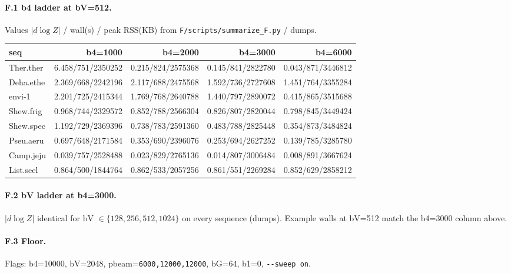 \documentclass[11pt]{article}
\begin{document}
\paragraph{F.1 b4 ladder at bV=512.}
Values $|d\log Z|$ / wall(s) / peak RSS(KB) from \texttt{F/scripts/summarize\_F.py} / dumps.

{\footnotesize
\begin{center}
\begin{tabular}{@{}lrrrr@{}}
\toprule
seq & b4=1000 & b4=2000 & b4=3000 & b4=6000 \\
\midrule
Ther.ther & 6.458/751/2350252 & 0.215/824/2575368 & 0.145/841/2822780 & 0.043/871/3446812 \\
Deha.ethe & 2.369/668/2242196 & 2.117/688/2475568 & 1.592/736/2727608 & 1.451/764/3355284 \\
envi-1 & 2.201/725/2415344 & 1.769/768/2640788 & 1.440/797/2890072 & 0.415/865/3515688 \\
Shew.frig & 0.968/744/2329572 & 0.852/788/2566304 & 0.826/807/2820044 & 0.798/845/3449424 \\
Shew.spec & 1.192/729/2369396 & 0.738/783/2591360 & 0.483/788/2825448 & 0.354/873/3484824 \\
Pseu.aeru & 0.697/648/2171584 & 0.353/690/2396076 & 0.253/694/2627252 & 0.139/785/3285780 \\
Camp.jeju & 0.039/757/2528488 & 0.023/829/2765136 & 0.014/807/3006484 & 0.008/891/3667624 \\
List.seel & 0.864/500/1844764 & 0.862/533/2057256 & 0.861/551/2269284 & 0.852/629/2858212 \\
\bottomrule
\end{tabular}
\end{center}
}

\paragraph{F.2 bV ladder at b4=3000.}
$|d\log Z|$ identical for bV $\in\{128,256,512,1024\}$ on every sequence (dumps). Example walls at bV=512 match the b4=3000 column above.

\paragraph{F.3 Floor.}
Flags: b4=10000, bV=2048, pbeam=\texttt{6000,12000,12000}, bG=64, b1=0, \texttt{-{}-sweep on}.
\end{document}
